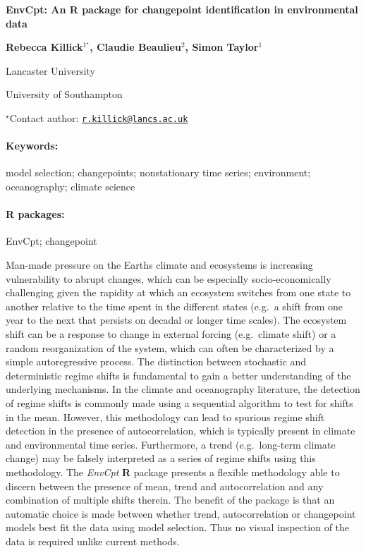 \documentclass[11pt, a4paper]{article}
\renewcommand{\title}[1]{\begin{center}{\bf \LARGE #1}\end{center}}
\newcommand{\keywords}{\paragraph{Keywords:}}
\newcommand{\packages}{\paragraph{R packages:}}
\begin{document}
\pagestyle{empty}

\title{EnvCpt: An R package for changepoint identification in environmental
data}

\begin{center}
  {\bf Rebecca Killick$^{1^\star}$, Claudie Beaulieu$^{2}$, Simon Taylor$^{1}$}
\end{center}

\vskip 0.3cm

\begin{affiliations}
\begin{enumerate}
\begin{minipage}{0.915\textwidth}
\centering
\item Lancaster University \\[-2pt]
\item University of Southampton \\[-2pt]
\end{minipage}
\end{enumerate}
$^\star$Contact author: \href{mailto:r.killick@lancs.ac.uk}{\nolinkurl{r.killick@lancs.ac.uk}}\\
\end{affiliations}

\vskip 0.5cm

\begin{minipage}{0.915\textwidth}
\keywords model selection; changepoints; nonstationary time series; environment;
oceanography; climate science
\packages EnvCpt; changepoint
\end{minipage}

\vskip 0.8cm

Man-made pressure on the Earths climate and ecosystems is increasing
vulnerability to abrupt changes, which can be especially
socio-economically challenging given the rapidity at which an ecosystem
switches from one state to another relative to the time spent in the
different states (e.g.~a shift from one year to the next that persists
on decadal or longer time scales). The ecosystem shift can be a response
to change in external forcing (e.g.~climate shift) or a random
reorganization of the system, which can often be characterized by a
simple autoregressive process. The distinction between stochastic and
deterministic regime shifts is fundamental to gain a better
understanding of the underlying mechanisms. In the climate and
oceanography literature, the detection of regime shifts is commonly made
using a sequential algorithm to test for shifts in the mean. However,
this methodology can lead to spurious regime shift detection in the
presence of autocorrelation, which is typically present in climate and
environmental time series. Furthermore, a trend (e.g.~long-term climate
change) may be falsely interpreted as a series of regime shifts using
this methodology. The \emph{EnvCpt} \textbf{R} package presents a
flexible methodology able to discern between the presence of mean, trend
and autocorrelation and any combination of multiple shifts therein. The
benefit of the package is that an automatic choice is made between
whether trend, autocorrelation or changepoint models best fit the data
using model selection. Thus no visual inspection of the data is required
unlike current methods.
\end{document}
